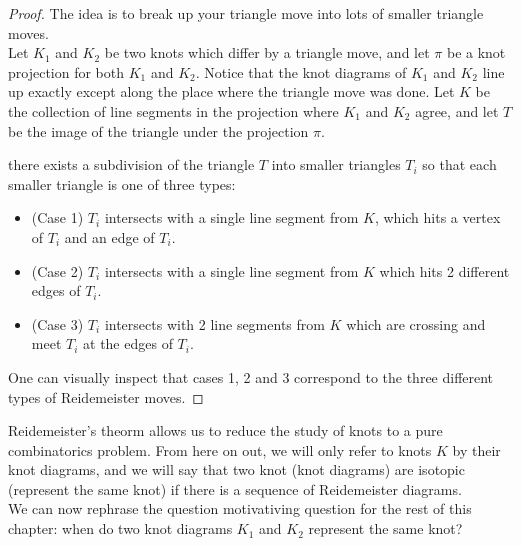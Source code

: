 \begin{proof}
The idea is to break up your triangle move into lots of smaller triangle moves. \\
Let $K_1$ and $K_2$ be two knots which differ by a triangle move, and let $\pi$ be a knot projection for both $K_1$ and $K_2$. Notice that the knot diagrams of $K_1$ and $K_2$ line up exactly except along the place where the triangle move was done. Let $K$ be the collection of line segments in the projection where $K_1$ and $K_2$ agree, and let $T$ be the image of the triangle under the projection $\pi$. 
\begin{claim} there exists a subdivision of the triangle $T$ into smaller triangles $T_i$ so that each smaller triangle is one of three types:
\begin{itemize}
\item (Case 1) $T_i$ intersects with a single line segment from $K$, which hits a vertex of $T_i$ and an edge of $T_i$. 
\item (Case 2) $T_i$ intersects with a single line segment from $K$ which hits 2 different edges of $T_i$. 
\item (Case 3) $T_i$ intersects with 2 line segments from $K$ which are crossing and meet $T_i$ at the edges of $T_i$. 
\end{itemize}
\end{claim}
One can visually inspect that cases 1, 2 and 3 correspond to the three different types of Reidemeister moves. 
\end{proof}
Reidemeister's theorm allows us to reduce the study of knots to a pure combinatorics problem. From here on out, we will only refer to knots $K$ by their knot diagrams, and we will say that two knot (knot diagrams) are isotopic  (represent the same knot)   if there is a sequence of Reidemeister diagrams. \\
We can now rephrase the question motivativing question for the rest of this chapter: when do two knot diagrams $K_1$ and $K_2$ represent the same knot?

